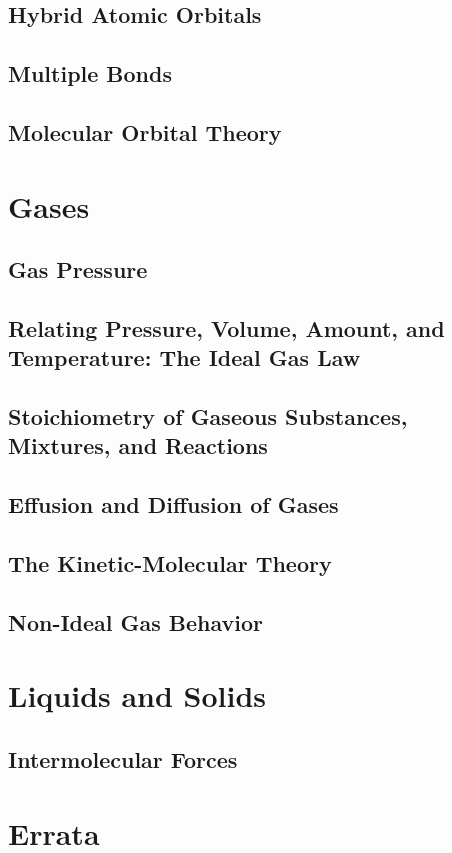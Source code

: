 \documentclass[12pt, openany, letterpaper]{memoir}
\begin{document}
\section{Hybrid Atomic Orbitals}

\section{Multiple Bonds}

\section{Molecular Orbital Theory}

\chapter{Gases}

\section{Gas Pressure}

\section{Relating Pressure, Volume, Amount, and Temperature: The Ideal Gas Law}

\section{Stoichiometry of Gaseous Substances, Mixtures, and Reactions}

\section{Effusion and Diffusion of Gases}

\section{The Kinetic-Molecular Theory}

\section{Non-Ideal Gas Behavior}

\chapter{Liquids and Solids}

\section{Intermolecular Forces}
\backmatter
\chapter{Errata}
\end{document}

